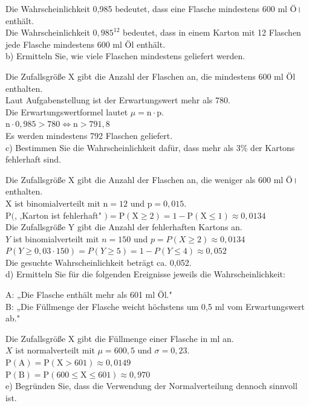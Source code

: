 \documentclass[10pt]{article}
\begin{document}
Die Wahrscheinlichkeit 0,985 bedeutet, dass eine Flasche mindestens 600 ml Ö। enthält.\\
Die Wahrscheinlichkeit $0,985^{12}$ bedeutet, dass in einem Karton mit 12 Flaschen jede Flasche mindestens 600 ml Öl enthält.\\
b) Ermitteln Sie, wie viele Flaschen mindestens geliefert werden.

Die Zufallsgröße X gibt die Anzahl der Flaschen an, die mindestens 600 ml Öl enthalten.\\
Laut Aufgabenstellung ist der Erwartungswert mehr als 780.\\
Die Erwartungswertformel lautet $\mu=\mathrm{n} \cdot \mathrm{p}$.\\
$\mathrm{n} \cdot 0,985>780 \Leftrightarrow \mathrm{n}>791,8$\\
Es werden mindestens 792 Flaschen geliefert.\\
c) Bestimmen Sie die Wahrscheinlichkeit dafür, dass mehr als 3\% der Kartons fehlerhaft sind.

Die Zufallsgröße X gibt die Anzahl der Flaschen an, die weniger als 600 ml Ö। enthalten.\\
X ist binomialverteilt mit $\mathrm{n}=12$ und $\mathrm{p}=0,015$.\\
$\mathrm{P}($, ,Karton ist fehlerhaft" $)=\mathrm{P}(\mathrm{X} \geq 2)=1-\mathrm{P}(\mathrm{X} \leq 1) \approx 0,0134$\\
Die Zufallsgröße Y gibt die Anzahl der fehlerhaften Kartons an.\\
$Y$ ist binomialverteilt mit $n=150$ und $p=P(X \geq 2) \approx 0,0134$\\
$P(Y \geq 0,03 \cdot 150)=P(Y \geq 5)=1-P(Y \leq 4) \approx 0,052$\\
Die gesuchte Wahrscheinlichkeit beträgt ca. 0,052.\\
d) Ermitteln Sie für die folgenden Ereignisse jeweils die Wahrscheinlichkeit:

A: „Die Flasche enthält mehr als 601 ml Öl."\\
B: „Die Füllmenge der Flasche weicht höchstens um 0,5 ml vom Erwartungswert ab."

Die Zufallsgröße X gibt die Füllmenge einer Flasche in ml an.\\
$X$ ist normalverteilt mit $\mu=600,5$ und $\sigma=0,23$.\\
$\mathrm{P}(\mathrm{A})=\mathrm{P}(\mathrm{X}>601) \approx 0,0149$\\
$\mathrm{P}(\mathrm{B})=\mathrm{P}(600 \leq \mathrm{X} \leq 601) \approx 0,970$\\
e) Begründen Sie, dass die Verwendung der Normalverteilung dennoch sinnvoll ist.
\end{document}
